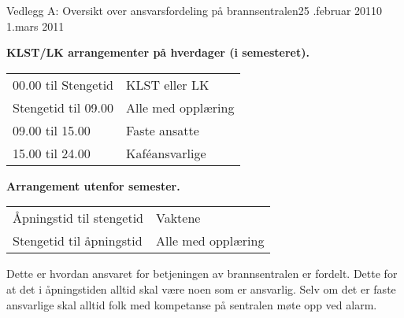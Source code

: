 \begin{instruks}{Vedlegg A: Oversikt over ansvarsfordeling på brannsentralen}{25 .februar 2011}{0 1.mars 2011}
    
    \textbf{KLST/LK arrangementer på hverdager (i semesteret).}
    
    \begin{tabular}{ll}
        00.00 til Stengetid &   KLST eller LK \\
        Stengetid til 09.00 &   Alle med opplæring \\
        09.00 til 15.00 &     Faste ansatte \\
        15.00 til 24.00 &      Kaf\'eansvarlige 
    \end{tabular}

    
    \textbf{Arrangement utenfor semester.}
    
    \begin{tabular}{ll}
        Åpningstid til stengetid &     Vaktene \\
        Stengetid til åpningstid &     Alle med opplæring
    \end{tabular}
    
    
    \vspace{10mm}
    Dette er hvordan ansvaret for betjeningen av brannsentralen er fordelt. Dette for at det i
    åpningstiden alltid skal være
    noen som er ansvarlig. Selv om det er faste ansvarlige skal alltid folk med kompetanse på
    sentralen møte opp ved alarm.
\end{instruks}



